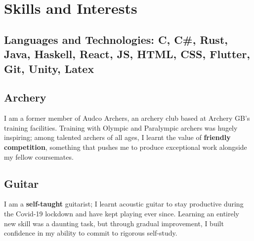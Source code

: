 \documentclass{article}
\newcommand{\indentedblock}[1]{
    \hfill
    \begin{minipage}{\dimexpr\textwidth - 1.95em}
        #1
    \end{minipage}
}
\begin{document}
\section*{Skills and Interests}

\subsection*{\textbf{Languages and Technologies}: C, C\#, Rust, Java, Haskell, React, JS, HTML, CSS, Flutter, Git, Unity, Latex}
\vspace{0.5em}

\subsection*{\textbf{Archery}}
\vspace{-0.5em}
\indentedblock{
    I am a former member of Audco Archers, an archery club based at Archery GB's training facilities.
    Training with Olympic and Paralympic archers was hugely inspiring; among talented archers of all ages, 
    I learnt the value of \textbf{friendly competition}, something that pushes me to produce exceptional work alongside 
    my fellow coursemates.
}

\subsection*{\textbf{Guitar}}
\vspace{-0.5em}
\indentedblock{
    I am a \textbf{self-taught} guitarist; I learnt acoustic guitar to stay productive during the Covid-19 lockdown and have kept playing ever since. 
    Learning an entirely new skill was a daunting task, but through gradual improvement, I built confidence in my ability to commit 
    to rigorous self-study.
}
\end{document}
